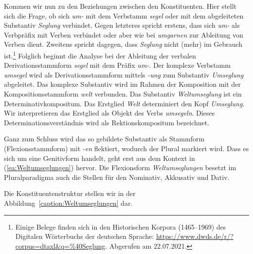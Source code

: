 Kommen wir nun zu den Beziehungen zwischen den Konstituenten. Hier stellt sich die Frage, ob sich \textit{um-} mit dem Verbstamm \textit{segel} oder mit dem abgeleiteten Substantiv \textit{Seglung} verbindet. Gegen letzteres spricht erstens, dass sich \textit{um-} als Verbpräfix mit Verben verbindet oder aber wie bei \textit{umgarnen} zur Ableitung von Verben dient. Zweitens spricht dagegen, dass \textit{Seglung} nicht (mehr) im Gebrauch ist.\footnote{Einige Belege finden sich in den Historischen Korpora (1465–1969) des Digitalen Wörterbuchs der deutschen Sprache: \url{https://www.dwds.de/r/?corpus=dtaxl&q=\%40Seglung}. Abgerufen am 22.07.2021.} Folglich beginnt die Analyse bei der Ableitung der verbalen Derivationsstammform \textit{segel} mit dem Präfix \textit{um-}. Der komplexe Verbstamm \textit{umsegel} wird als Derivationsstammform mittels \textit{-ung} zum Substantiv \textit{Umseglung} abgeleitet. Das komplexe Substantiv wird im Rahmen der Komposition mit der Kompositionsstammform \textit{welt} verbunden. Das Substantiv \textit{Weltumseglung} ist ein Determinativkompositum. Das Erstglied \textit{Welt} determiniert den Kopf \textit{Umseglung}. Wir interpretieren das Erstglied als Objekt des Verbs \textit{umsegeln}. Dieses Determinationsverständnis wird als Rektionskompositum bezeichnet.

Ganz zum Schluss wird das so gebildete Substantiv als Stammform (Flexionsstammform) mit \textit{-en} flektiert, wodurch der Plural markiert wird. Dass es sich um eine Genitivform handelt, geht erst aus dem Kontext in (\ref{ea:Weltumseglungen}) hervor. Die Flexionsform \textit{Weltumseglungen} besetzt im Pluralparadigma auch die Stellen für den Nominativ, Akkusativ und Dativ. 

Die Konstituentenstruktur stellen wir in der Abbildung~\ref{caption:Weltumseglungen} dar.

